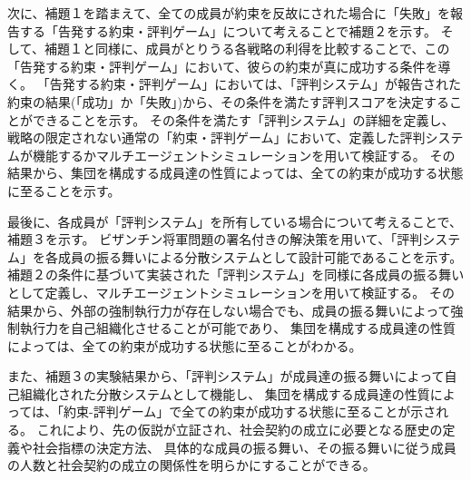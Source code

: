 次に、補題１を踏まえて、全ての成員が約束を反故にされた場合に「失敗」を報告する「告発する約束・評判ゲーム」について考えることで補題２を示す。
そして、補題１と同様に、成員がとりうる各戦略の利得を比較することで、この「告発する約束・評判ゲーム」において、彼らの約束が真に成功する条件を導く。
「告発する約束・評判ゲーム」においては、「評判システム」が報告された約束の結果(「成功」か「失敗」)から、その条件を満たす評判スコアを決定することができることを示す。
その条件を満たす「評判システム」の詳細を定義し、
戦略の限定されない通常の「約束・評判ゲーム」において、定義した評判システムが機能するかマルチエージェントシミュレーションを用いて検証する。
その結果から、集団を構成する成員達の性質によっては、全ての約束が成功する状態に至ることを示す。

最後に、各成員が「評判システム」を所有している場合について考えることで、補題３を示す。
ビザンチン将軍問題の署名付きの解決策を用いて、「評判システム」を各成員の振る舞いによる分散システムとして設計可能であることを示す。
補題２の条件に基づいて実装された「評判システム」を同様に各成員の振る舞いとして定義し、マルチエージェントシミュレーションを用いて検証する。
その結果から、外部の強制執行力が存在しない場合でも、成員の振る舞いによって強制執行力を自己組織化させることが可能であり、
集団を構成する成員達の性質によっては、全ての約束が成功する状態に至ることがわかる。

また、補題３の実験結果から、「評判システム」が成員達の振る舞いによって自己組織化された分散システムとして機能し、
集団を構成する成員達の性質によっては、「約束-評判ゲーム」で全ての約束が成功する状態に至ることが示される。
これにより、先の仮説が立証され、社会契約の成立に必要となる歴史の定義や社会指標の決定方法、
具体的な成員の振る舞い、その振る舞いに従う成員の人数と社会契約の成立の関係性を明らかにすることができる。
